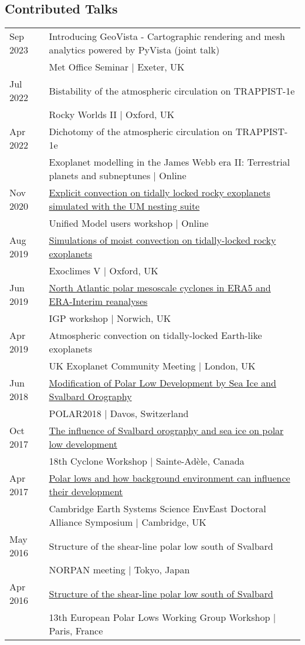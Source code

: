\documentclass[a4paper, 11pt]{article}
\begin{document}
\subsection*{Contributed Talks}
\begin{tabularx}{\linewidth}{@{}l X@{}}
Sep 2023 & Introducing GeoVista - Cartographic rendering and mesh analytics powered by PyVista (joint talk) \\ & Met Office Seminar | Exeter, UK \\
Jul 2022 & Bistability of the atmospheric circulation on TRAPPIST-1e \\ & Rocky Worlds II | Oxford, UK \\
Apr 2022 & Dichotomy of the atmospheric circulation on TRAPPIST-1e \\ & Exoplanet modelling in the James Webb era II: Terrestrial planets and subneptunes | Online \\
Nov 2020 & \href{https://slides.com/denissergeev/2020-11-10-um-workshop-sergeev}{Explicit convection on tidally locked rocky exoplanets simulated with the UM nesting suite} \\ & Unified Model users workshop | Online \\
Aug 2019 & \href{https://youtu.be/9nGIpQiPwDs}{Simulations of moist convection on tidally-locked rocky exoplanets} \\ & Exoclimes V | Oxford, UK \\
Jun 2019 & \href{https://speakerdeck.com/dennissergeev/north-atlantic-polar-mesoscale-cyclones-in-era5-and-era-interim-reanalyses}{North Atlantic polar mesoscale cyclones in ERA5 and ERA-Interim reanalyses} \\ & IGP workshop | Norwich, UK \\
Apr 2019 & Atmospheric convection on tidally-locked Earth-like exoplanets \\ & UK Exoplanet Community Meeting | London, UK \\
Jun 2018 & \href{https://speakerdeck.com/dennissergeev/polar2018}{Modification of Polar Low Development by Sea Ice and Svalbard Orography} \\ & POLAR2018 | Davos, Switzerland \\
Oct 2017 & \href{https://figshare.com/articles/The_influence_of_Svalbard_orography_and_sea_ice_on_polar_low_development/5510416}{The influence of Svalbard orography and sea ice on polar low development} \\ & 18th Cyclone Workshop | Sainte-Adèle, Canada \\
Apr 2017 & \href{http://dennissergeev.github.io/ceeda2017}{Polar lows and how background environment can influence their development} \\ & Cambridge Earth Systems Science EnvEast Doctoral Alliance Symposium | Cambridge, UK \\
May 2016 & Structure of the shear-line polar low south of Svalbard \\ & NORPAN meeting | Tokyo, Japan \\
Apr 2016 & \href{http://slides.com/denissergeev/deck}{Structure of the shear-line polar low south of Svalbard} \\ & 13th European Polar Lows Working Group Workshop | Paris, France \\
\end{tabularx}
\end{document}
